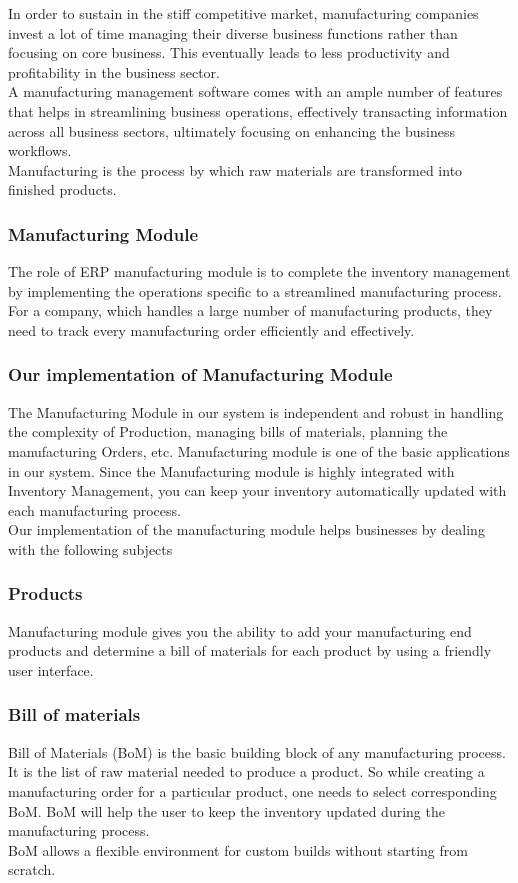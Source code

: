 In order to sustain in the stiff competitive market, manufacturing companies invest a lot of time
managing their diverse business functions rather than focusing on core business. This eventually leads
to less productivity and profitability in the business sector.\\
A manufacturing management software comes with an ample number of features that helps in
streamlining business operations, effectively transacting information across all business sectors,
ultimately focusing on enhancing the business workflows.\\
Manufacturing is the process by which raw materials are transformed into finished products.

\subsubsection{Manufacturing Module}
The role of ERP manufacturing module is to complete the inventory management by implementing
the operations specific to a streamlined manufacturing process. For a company, which handles a large
number of manufacturing products, they need to track every manufacturing order efficiently and
effectively.

\subsubsection{Our implementation of Manufacturing Module}
The Manufacturing Module in our system is independent and robust in handling the complexity of
Production, managing bills of materials, planning the manufacturing Orders, etc. Manufacturing
module is one of the basic applications in our system. Since the Manufacturing module is highly
integrated with Inventory Management, you can keep your inventory automatically updated with each
manufacturing process.\\
Our implementation of the manufacturing module helps businesses by dealing with the following
subjects
\subsubsection{Products}
Manufacturing module gives you the ability to add your manufacturing end products and determine a
bill of materials for each product by using a friendly user interface.
\subsubsection{Bill of materials}
Bill of Materials (BoM) is the basic building block of any manufacturing process. It is the list of raw
material needed to produce a product. So while creating a manufacturing order for a particular
product, one needs to select corresponding BoM. BoM will help the user to keep the inventory
updated during the manufacturing process.\\
BoM allows a flexible environment for custom builds without starting from scratch.

